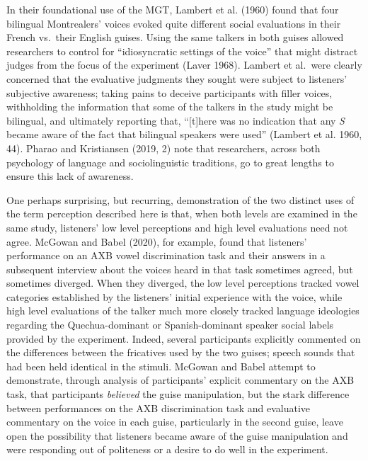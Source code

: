 \documentclass[
  letterpaper,
  DIV=11,
  numbers=noendperiod]{scrartcl}
\begin{document}
In their foundational use of the MGT, Lambert et al. (1960) found that
four bilingual Montrealers' voices evoked quite different social
evaluations in their French vs.~their English guises. Using the same
talkers in both guises allowed researchers to control for
``idiosyncratic settings of the voice'' that might distract judges from
the focus of the experiment (Laver 1968). Lambert et al.~were clearly
concerned that the evaluative judgments they sought were subject to
listeners' subjective awareness; taking pains to deceive participants
with filler voices, withholding the information that some of the talkers
in the study might be bilingual, and ultimately reporting that,
``{[}t{]}here was no indication that any \emph{S} became aware of the
fact that bilingual speakers were used'' (Lambert et al. 1960, 44).
Pharao and Kristiansen (2019, 2) note that researchers, across both
psychology of language and sociolinguistic traditions, go to great
lengths to ensure this lack of awareness.

One perhaps surprising, but recurring, demonstration of the two distinct
uses of the term perception described here is that, when both levels are
examined in the same study, listeners' low level perceptions and high
level evaluations need not agree. McGowan and Babel (2020), for example,
found that listeners' performance on an AXB vowel discrimination task
and their answers in a subsequent interview about the voices heard in
that task sometimes agreed, but sometimes diverged. When they diverged,
the low level perceptions tracked vowel categories established by the
listeners' initial experience with the voice, while high level
evaluations of the talker much more closely tracked language ideologies
regarding the Quechua-dominant or Spanish-dominant speaker social labels
provided by the experiment. Indeed, several participants explicitly
commented on the differences between the fricatives used by the two
guises; speech sounds that had been held identical in the stimuli.
McGowan and Babel attempt to demonstrate, through analysis of
participants' explicit commentary on the AXB task, that participants
\emph{believed} the guise manipulation, but the stark difference between
performances on the AXB discrimination task and evaluative commentary on
the voice in each guise, particularly in the second guise, leave open
the possibility that listeners became aware of the guise manipulation
and were responding out of politeness or a desire to do well in the
experiment.
\end{document}
